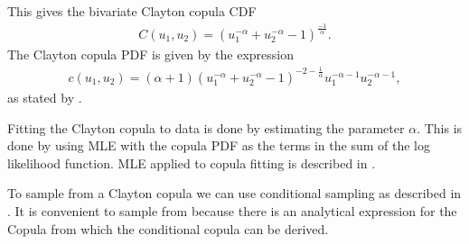 \documentclass[%
a4paper,							
11pt,								
bibliography=totoc,						
abstracton=true					
]
{scrartcl}
\theoremstyle{plain}
\theoremstyle{definition}
\theoremstyle{remark}
\newcommand{\1}{\mathbbm{1}}
\begin{document}
This gives the bivariate Clayton copula \gls{CDF}
\begin{align*}
    C(u_1,u_2) = (u_1^{-\alpha} + u_2^{-\alpha}-1)^{\frac{-1}{\alpha}}.
\end{align*}
The Clayton copula \gls{PDF} is given by the expression
\begin{align*}
    c(u_1,u_2) = (\alpha+1)(u_1^{-\alpha}+u_2^{-\alpha}-1)^{-2- \frac{1}{\alpha}}u_1^{-\alpha -1} u_2^{-\alpha -1},
\end{align*}
as stated by . 

Fitting the Clayton copula to data is done by estimating the parameter $\alpha$. This is done by using \gls{MLE} with the copula \gls{PDF} as the terms in the sum of the log likelihood function. \gls{MLE} applied to copula fitting is described in . 

To sample from a Clayton copula we can use conditional sampling as described in . It is convenient to sample from because there is an analytical expression for the Copula from which the conditional copula can be derived. 


\newpage
\end{document}
